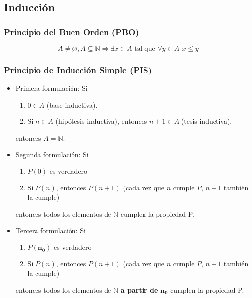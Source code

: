 \begin{multicols}{2}
    \section{Inducción}
    \subsubsection*{Principio del Buen Orden (PBO)}
    $$
    A \neq \varnothing, A \subseteq \mathbb{N} \Rightarrow \exists x \in A \text{ tal que } \forall y \in A, x \leq y
    $$
    
    \subsubsection*{Principio de Inducción Simple (PIS)}
    \begin{itemize}
        \item Primera formulación:
        Si
        \begin{enumerate}
            \item $0 \in A$ (base inductiva).
            \item Si $n \in A$ (hipótesis inductiva), entonces $n + 1 \in A$ (tesis inductiva).
        \end{enumerate}
        entonces $A = \mathbb{N}$.
        \item Segunda formulación:
        Si
        \begin{enumerate}
            \item $P(0)$ es verdadero
            \item Si $P(n)$, entonces $P(n + 1)$ (cada vez que $n$ cumple $P$, $n + 1$ también la cumple)
        \end{enumerate}
        entonces todos los elementos de $\mathbb{N}$ cumplen la propiedad P.
        \item Tercera formulación:
        Si
        \begin{enumerate}
            \item $P(\mathbf{n_0})$ es verdadero
            \item Si $P(n)$, entonces $P(n + 1)$ (cada vez que $n$ cumple $P$, $n + 1$ también la cumple)
        \end{enumerate}
        entonces todos los elementos de $\mathbb{N}$ \textbf{a partir de} $\mathbf{n_0}$ cumplen la propiedad P.
    \end{itemize}
    

\end{multicols}
